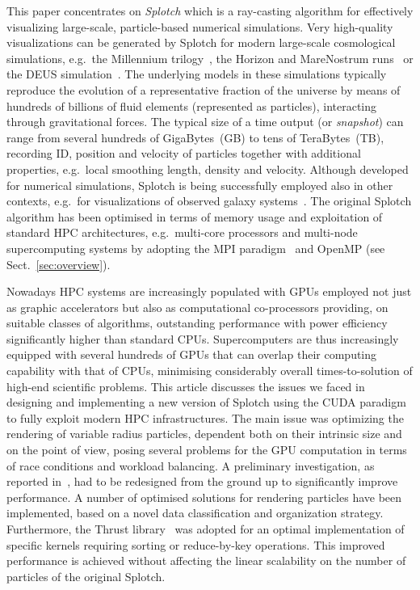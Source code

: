 \documentclass[preprint,5pt]{elsarticle}
\begin{document}
This paper concentrates on {\it Splotch} \cite{2008NJPh...10l5006D} which is a ray-casting algorithm for effectively visualizing large-scale, particle-based numerical simulations. Very high-quality visualizations can be generated by Splotch for modern large-scale cosmological simulations, e.g.\ the Millennium trilogy~\cite{millennium}, the Horizon and MareNostrum runs~\cite{horizon} or the DEUS simulation~\cite{deus}. The underlying models in these simulations typically reproduce the evolution of a representative fraction of the universe by means of hundreds of billions of fluid elements (represented as particles), interacting through gravitational forces. The typical size of a time output (or {\it snapshot}) can range from several hundreds of GigaBytes~(GB) to tens of TeraBytes~(TB), recording ID, position and velocity of particles together with additional properties, e.g.\ local smoothing length, density and velocity. Although developed for numerical simulations, Splotch is being successfully employed also in other contexts, e.g.\ for visualizations of observed galaxy systems~\cite{m83-vis}.
The original Splotch algorithm has been optimised in terms of memory usage and exploitation of standard HPC architectures, e.g.\ multi-core processors and multi-node supercomputing systems by adopting the MPI paradigm~\cite{jin:high-performance} and OpenMP (see Sect.~\ref{sec:overview}).

Nowadays HPC systems are increasingly populated with GPUs employed not just as graphic accelerators but also as computational co-processors providing, on suitable classes of algorithms, outstanding performance with power efficiency significantly higher than standard CPUs. Supercomputers are thus increasingly equipped with several hundreds of GPUs that can overlap their computing capability with that of CPUs, minimising considerably overall times-to-solution of high-end scientific problems. This article discusses the issues we faced in designing and implementing a new version of Splotch using the CUDA paradigm~\cite{cudaurl} to fully exploit modern HPC infrastructures. The main issue was optimizing the rendering of variable radius particles, dependent both on their intrinsic size and on the point of view, posing several problems for the GPU computation in terms of race conditions and workload balancing. A preliminary investigation, as reported in~\cite{jin:high-performance}, had to be redesigned from the ground up to significantly improve performance. A number of optimised solutions for rendering particles have been implemented, based on a novel data classification and organization strategy. Furthermore, the Thrust library~\cite{thrusturl} was adopted for an optimal implementation of specific kernels requiring sorting or reduce-by-key operations.
This improved performance is achieved without affecting the linear scalability on the number of particles of the original Splotch. 
\end{document}

